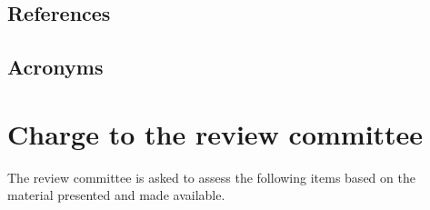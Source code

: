 \documentclass[DM,lsstdraft,STS,toc]{lsstdoc}
\begin{document}
\subsection{References\label{sect:references}}
\renewcommand{\refname}{}


\subsection{Acronyms \label{sect:acronyms}} %



\newpage
\section{Charge to the review committee}
\label{sec:charge}
The review committee is asked to assess the following items based on the material presented and made available.
%
\end{document}
